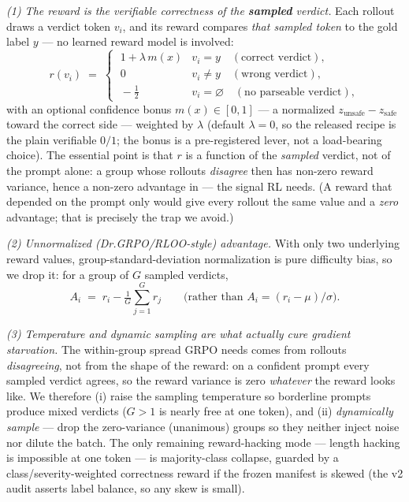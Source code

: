 \emph{(1) The reward is the verifiable correctness of the \textbf{sampled} verdict.} Each rollout draws a
verdict token $v_i$, and its reward compares \emph{that sampled token} to the gold label $y$ --- no learned
reward model is involved:
\begin{equation}
r(v_i) \;=\;
\begin{cases}
\;1 + \lambda\, m(x) & v_i = y \quad(\text{correct verdict}),\\[1pt]
\;0 & v_i \neq y \quad(\text{wrong verdict}),\\[1pt]
\;-\tfrac{1}{2} & v_i=\varnothing \quad(\text{no parseable verdict}),
\end{cases}
\label{eq:grpo-reward}
\end{equation}
with an optional confidence bonus $m(x)\in[0,1]$ --- a normalized $z_{\text{unsafe}}-z_{\text{safe}}$ toward
the correct side --- weighted by $\lambda$ (default $\lambda=0$, so the released recipe is the plain
verifiable $0/1$; the bonus is a pre-registered lever, not a load-bearing choice). The essential point is
that $r$ is a function of the \emph{sampled} verdict, not of the prompt alone: a group whose rollouts
\emph{disagree} then has non-zero reward variance, hence a non-zero advantage in  --- the
signal RL needs. (A reward that depended on the prompt only would give every rollout the same value and a
\emph{zero} advantage; that is precisely the trap we avoid.)

\emph{(2) Unnormalized (Dr.GRPO/RLOO-style) advantage.} With only two underlying reward values,
group-standard-deviation normalization is pure difficulty bias, so we drop it: for a group of $G$
sampled verdicts,
\begin{equation}
A_i \;=\; r_i - \tfrac{1}{G}\textstyle\sum_{j=1}^{G} r_j
\qquad\text{(rather than } A_i=(r_i-\mu)/\sigma\text{)}.
\label{eq:grpo-adv}
\end{equation}

\emph{(3) Temperature and dynamic sampling are what actually cure gradient starvation.} The within-group
spread GRPO needs comes from rollouts \emph{disagreeing}, not from the shape of the reward: on a confident
prompt every sampled verdict agrees, so the reward variance is zero \emph{whatever} the reward looks like.
We therefore (i) raise the sampling temperature so borderline prompts produce mixed verdicts ($G>1$ is
nearly free at one token), and (ii) \emph{dynamically sample} --- drop the zero-variance (unanimous) groups
so they neither inject noise nor dilute the batch. The only remaining reward-hacking mode --- length hacking
is impossible at one token --- is majority-class collapse, guarded by a class/severity-weighted correctness
reward if the frozen manifest is skewed (the v2 audit asserts label balance, so any skew is small).

